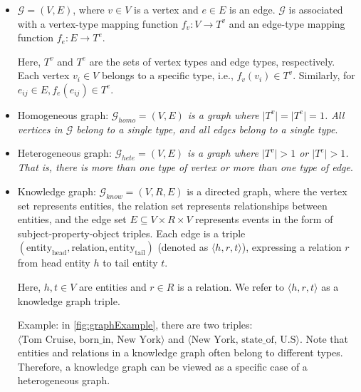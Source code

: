\begin{itemize}
	\item \begin{definition}[Graph]\label{def:defGraph}
		\(\mathcal{G} = (V, E)\), where \(v \in V\) is a vertex and \(e \in E\) is an edge. \(\mathcal{G}\) is associated with a vertex-type mapping function \(f_v: V \to T^v\) and an edge-type mapping function \(f_e: E \to T^e\).
	\end{definition}
	
	Here, \(T^v\) and \(T^e\) are the sets of vertex types and edge types, respectively. Each vertex \(v_i \in V\) belongs to a specific type, i.e., \(f_v(v_i) \in T^v\). Similarly, for \(e_{ij} \in E, f_e (e_{ij}) \in T^e\).
	
	\item
	\begin{definition}\label{def:homogeneous}
		Homogeneous graph: \textit{ $\mathcal{G}_{homo} = (V, E)$ is a graph where $\mid T^v \mid = \mid T^e \mid = 1$. All vertices in $\mathcal{G}$ belong to a single type, and all edges belong to a single type}.
	\end{definition}
	
	\item
	\begin{definition}\label{def:heterogeneous}
		Heterogeneous graph: \textit{$\mathcal{G}_{hete} = (V, E)$ is a graph where $\mid T^v \mid > 1$ or $\mid T^e \mid > 1$. That is, there is more than one type of vertex or more than one type of edge}.
	\end{definition}
	
	\item
	\begin{definition}\label{def:knowledgeGraph}
		Knowledge graph:
		$\mathcal{G}_{know} = (V, R, E)$ is a directed graph, where the vertex set represents entities, the relation set represents relationships between entities, and the edge set $E \subseteq V\times R \times V$ represents events in the form of subject-property-object triples. Each edge is a triple $(\text{entity}_{\text{head}}, \text{relation}, \text{entity}_{\text{tail}})$ (denoted as $\langle h, r, t \rangle$), expressing a relation $r$ from head entity $h$ to tail entity $t$.
	\end{definition}
	
	Here, $h, t \in V$ are entities and $r \in R$ is a relation. We refer to $\langle h, r, t \rangle$ as a knowledge graph triple.
	
	Example: in \autoref{fig:graphExample}, there are two triples: 
	$\langle \text{Tom Cruise, born\_in, New York} \rangle$
	and $\langle \text{New York, state\_of, U.S} \rangle$. Note that entities and relations in a knowledge graph often belong to different types. Therefore, a knowledge graph can be viewed as a specific case of a heterogeneous graph.
\end{itemize}

